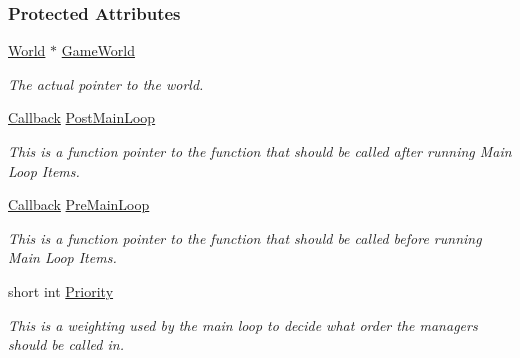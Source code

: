 \subsubsection*{Protected Attributes}
\begin{DoxyCompactItemize}
\item 
\hypertarget{classMezzanine_1_1ManagerBase_a3590a02f8319f60d9a4ea5a798825df2}{
\hyperlink{classMezzanine_1_1World}{World} $\ast$ \hyperlink{classMezzanine_1_1ManagerBase_a3590a02f8319f60d9a4ea5a798825df2}{GameWorld}}
\label{classMezzanine_1_1ManagerBase_a3590a02f8319f60d9a4ea5a798825df2}

\begin{DoxyCompactList}\small\item\em The actual pointer to the world. \item\end{DoxyCompactList}\item 
\hypertarget{classMezzanine_1_1ManagerBase_ab27f3f7458b9a6f2a08974d096125ed5}{
\hyperlink{classMezzanine_1_1ManagerBase_ab23a9aa27c4e3cb58d902a149d3c6de2}{Callback} \hyperlink{classMezzanine_1_1ManagerBase_ab27f3f7458b9a6f2a08974d096125ed5}{PostMainLoop}}
\label{classMezzanine_1_1ManagerBase_ab27f3f7458b9a6f2a08974d096125ed5}

\begin{DoxyCompactList}\small\item\em This is a function pointer to the function that should be called after running Main Loop Items. \item\end{DoxyCompactList}\item 
\hypertarget{classMezzanine_1_1ManagerBase_a1652110258237bc313a02757229d0f47}{
\hyperlink{classMezzanine_1_1ManagerBase_ab23a9aa27c4e3cb58d902a149d3c6de2}{Callback} \hyperlink{classMezzanine_1_1ManagerBase_a1652110258237bc313a02757229d0f47}{PreMainLoop}}
\label{classMezzanine_1_1ManagerBase_a1652110258237bc313a02757229d0f47}

\begin{DoxyCompactList}\small\item\em This is a function pointer to the function that should be called before running Main Loop Items. \item\end{DoxyCompactList}\item 
short int \hyperlink{classMezzanine_1_1ManagerBase_a96fb02bf2f4e8b4afe70dedd0d8c6ac9}{Priority}
\begin{DoxyCompactList}\small\item\em This is a weighting used by the main loop to decide what order the managers should be called in. \item\end{DoxyCompactList}\end{DoxyCompactItemize}


